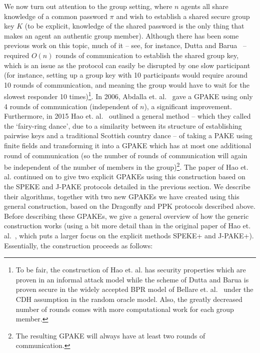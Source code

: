 We now turn out attention to the group setting, where $n$ agents all share knowledge of a common password $\pi$ and wish to establish a shared secure group key $K$ (to be explicit, knowledge of the shared password is the only thing that makes an agent an authentic group member).  Although there has been some previous work on this topic, much of it -- see, for instance, Dutta and Barua~\cite{DuBa06} -- required $O(n)$ rounds of communication to establish the shared group key, which is an issue as the protocol can easily be disrupted by one slow participant (for instance, setting up a group key with 10 participants would require around 10 rounds of communication, and meaning the group would have to wait for the slowest responder 10 times)\footnote{To be fair, the construction of Hao et. al. has security properties which are proven in an informal attack model while the scheme of Dutta and Barua is proven secure in the widely accepted BPR model of Bellare et. al.~\cite{BePoRo00} under the CDH assumption in the random oracle model.  Also, the greatly decreased number of rounds comes with more computational work for each group member.}.  In 2006, Abdalla et. al.~\cite{AbBrChPo06} gave a GPAKE using only 4 rounds of communication (independent of $n$), a significant improvement.  Furthermore, in 2015 Hao et. al.~\cite{HaYiChSh15} outlined a general method -- which they called the `fairy-ring dance', due to a similarity between its structure of establishing pairwise keys and a traditional Scottish country dance -- of taking a PAKE using finite fields and transforming it into a GPAKE which has at most one additional round of communication (so the number of rounds of communication will again be independent of the number of members in the group)\footnote{The resulting GPAKE will always have at least two rounds of communication.}.  The paper of Hao et. al. continued on to give two explicit GPAKEs using this construction based on the SPEKE and J-PAKE protocols detailed in the previous section.  We describe their algorithms, together with two new GPAKEs we have created using this general construction, based on the Dragonfly and PPK protocols described above.
\\

Before describing these GPAKEs, we give a general overview of how the generic construction works (using a bit more detail than in the original paper of Hao et. al.~\cite{HaYiChSh15}, which puts a larger focus on the explicit methods SPEKE+ and J-PAKE+).  Essentially, the construction proceeds as follows:
\\

